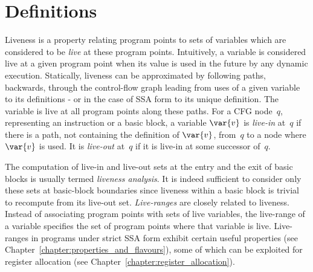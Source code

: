 \section{Definitions}
Liveness is a property relating program points to sets of variables which are considered to be \emph{live} at these program points.
Intuitively, a variable is considered live at a given program point when its value is used in the future by any dynamic execution.
Statically, liveness can be approximated by following paths, backwards, through the control-flow graph leading from uses of a given variable to its definitions - or in the case of SSA form to its unique definition.
The variable is live at all program points along these paths.
For a CFG node~$q$, representing an instruction or a basic block, a variable $\var{v}$ is \emph{live-in} at~$q$ if there is a path, not containing the definition of $\var{v}$, from~$q$ to a node where $\var{v}$ is used.
It is \emph{live-out} at~$q$ if it is live-in at some successor of~$q$.

The computation of live-in and live-out sets at the entry and the exit of basic blocks is usually termed \emph{liveness analysis}.
It is indeed sufficient to consider only these sets at basic-block boundaries since liveness within a basic block is trivial to recompute from its live-out set.
\emph{Live-ranges} are closely related to liveness.
Instead of associating program points with sets of live variables, the live-range of a variable specifies the set of program points where that variable is live.
Live-ranges in programs under strict SSA form exhibit certain useful properties (see Chapter~\ref{chapter:properties_and_flavours}), some of which can be exploited for register allocation (see Chapter~\ref{chapter:register_allocation}).


